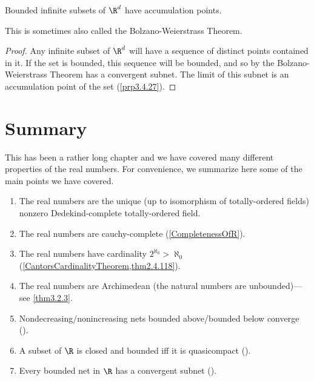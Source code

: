 \begin{crl}{}{}
Bounded infinite subsets of $\R ^d$ have accumulation points.
\begin{rmk}
This is sometimes also called the Bolzano-Weierstrass Theorem.
\end{rmk}
\begin{proof}
Any infinite subset of $\R ^d$ will have a sequence of distinct points contained in it.  If the set is bounded, this sequence will be bounded, and so by the Bolzano-Weierstrass Theorem has a convergent subnet.  The limit of this subnet is an accumulation point of the set (\cref{prp3.4.27}).
\end{proof}
\end{crl}

\section{Summary}

This has been a rather long chapter and we have covered many different properties of the real numbers.  For convenience, we summarize here some of the main points we have covered.
\begin{enumerate}
\item The real numbers are the unique (up to isomorphism of totally-ordered fields) nonzero Dedekind-complete totally-ordered field.
\item The real numbers are cauchy-complete (\cref{CompletenessOfR}).
\item The real numbers have cardinality $2^{\aleph _0}>
\aleph _0$ (\cref{CantorsCardinalityTheorem,thm2.4.118}).
\item The real numbers are Archimedean (the natural numbers are unbounded)---see \cref{thm3.2.3}.
\item Nondecreasing/nonincreasing nets bounded above/bounded below converge ().
\item A subset of $\R$ is closed and bounded iff it is quasicompact ().
\item Every bounded net in $\R$ has a convergent subnet ().
\end{enumerate}